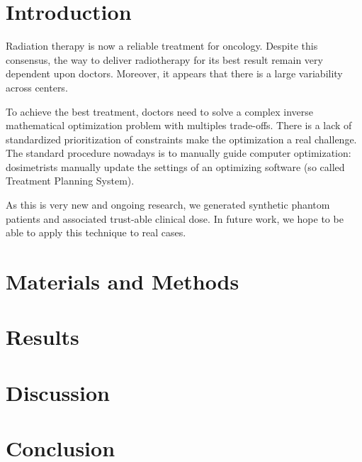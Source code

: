 \section{Introduction}

Radiation therapy is now a reliable treatment for oncology.
Despite this consensus, the way to deliver radiotherapy for its best result remain very dependent upon doctors.
Moreover, it appears that there is a large variability across centers.

To achieve the best treatment, doctors need to solve a complex inverse mathematical optimization problem with multiples trade-offs.
There is a lack of standardized prioritization of constraints make the optimization a real challenge.
The standard procedure nowadays is to manually guide computer optimization: dosimetrists manually update the settings of an optimizing software (so called Treatment Planning System).


As this is very new and ongoing research, we generated synthetic phantom patients and associated trust-able clinical dose.
In future work, we hope to be able to apply this technique to real cases.

\section{Materials and Methods}

\section{Results}

\section{Discussion}

\section{Conclusion}
